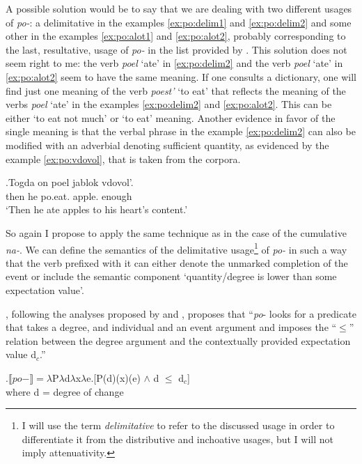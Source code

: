 A possible solution would be to say that we are dealing with two different usages of \textit{po-}: a delimitative in the examples \ref{ex:po:delim1} and \ref{ex:po:delim2} and some other in the examples \ref{ex:po:alot1} and \ref{ex:po:alot2}, probably corresponding to the last, resultative, usage of \textit{po-} in the list provided by \citet{Shvedova:82}. This solution does not seem right to me: the verb \textit{poel} `ate' in \ref{ex:po:delim2} and the verb \textit{poel} `ate' in \ref{ex:po:alot2} seem to have the same meaning. If one consults a dictionary, one will find just one meaning of the verb \textit{poest'} `to eat' that reflects the meaning of the verbs \textit{poel} `ate' in the examples \ref{ex:po:delim2} and \ref{ex:po:alot2}. This can be either `to eat not much' \citep{Ushakov:50} or `to eat' \citep{Efremova:00} meaning. Another evidence in favor of the single meaning is that the verbal phrase in the example \ref{ex:po:delim2} can also be modified with an adverbial denoting sufficient quantity, as evidenced by the example \ref{ex:po:vdovol}, that is taken from the corpora.

\exg.\label{ex:po:vdovol}Togda on poel jablok vdovol'.\\
then he po.eat. apple. enough\\
\trans `Then he ate apples to his heart's content.'\\

So again I propose to apply the same technique as in the case of the cumulative \textit{na-}. We can define the semantics of the delimitative usage\footnote{I will use the term \textit{delimitative} to refer to the discussed usage in order to differentiate it from the distributive and inchoative usages, but I will not imply attenuativity.} of \textit{po-} in such a way that the verb prefixed with it can either denote the unmarked completion of the event or include the semantic component `quantity/degree is lower than some expectation value'. 

\citet[48]{Kagan:book}, following the analyses proposed by \citet{Filip:00} and \citet{Souchkova:04}, proposes that ``\textit{po}- looks for a predicate that takes a degree, and individual and an event argument and imposes the ``$\leqslant$'' relation between the degree argument and the contextually provided expectation value d$_c$.''

\ex.\label{Kagan:po}$\llbracket po- \rrbracket = \lambda$P$\lambda$d$\lambda$x$\lambda$e.[P(d)(x)(e) $\wedge$ d $\leqslant$ d$_c$]\\
where d = degree of change \citep{KennedyLevin:02}

